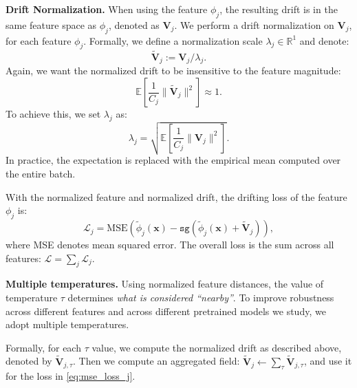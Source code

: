 \documentclass{article}
\newcommand{\vv}[1]{\mathbf{#1}}
\newcommand{\x}{\vv{x}}
\newcommand{\V}{\vv{V}}
\renewcommand{\paragraph}[1]{\vspace{.05em}\noindent\textbf{#1}}
\theoremstyle{plain}
\theoremstyle{definition}
\theoremstyle{remark}
\begin{document}
\paragraph{Drift Normalization.} When using the feature $\phi_j$, the resulting drift is in the same feature space as $\phi_j$, denoted as $\V_j$. We perform a drift normalization on $\V_j$, for each feature $\phi_j$. Formally, we define a normalization scale $\lambda_j \in \mathbb{R}^1$ and denote:
\begin{equation}
\tilde{\V}_j:=\V_j / \lambda_j.
\end{equation}
Again, we want the normalized drift to be insensitive to the feature magnitude:
\begin{equation}
\mathbb{E} \left[ \frac{1}{C_j}\| \tilde{\V}_j \|^2 \right] \approx 1.
\end{equation}
To achieve this, we set $\lambda_j$ as:
\begin{equation}
\label{eq:lambda}
\lambda_j = \sqrt{\mathbb{E} \left[ \frac{1}{C_j} \| \V_j \|^2 \right]}.
\end{equation}
In practice, the expectation is replaced with the empirical mean computed over the entire batch.

With the normalized feature and normalized drift, the drifting loss of the feature $\phi_j$ is:
\begin{equation}
\label{eq:mse_loss_j}
\mathcal{L}_j = \text{MSE}(\tilde\phi_j({\x}) -  \texttt{sg}(\tilde\phi_j({\x}) + \tilde{\V}_j)),
\end{equation}
where MSE denotes mean squared error.
The overall loss is the sum across all features:
$\mathcal{L} = \sum_j {\mathcal{L}_j}$.

\paragraph{Multiple temperatures.}
Using normalized feature distances, the value of temperature $\tau$ determines \textit{what is considered ``nearby''}.
To improve robustness across different features and across different pretrained models we study, we adopt multiple temperatures.

Formally, for each $\tau$ value, we compute the normalized drift as described above, denoted by $\tilde{\V}_{j,\tau}$. Then we compute an aggregated field: $\tilde{\V}_j \leftarrow \sum_\tau \tilde{\V}_{j,\tau}$, and use it for the loss in \cref{eq:mse_loss_j}.

\end{document}

